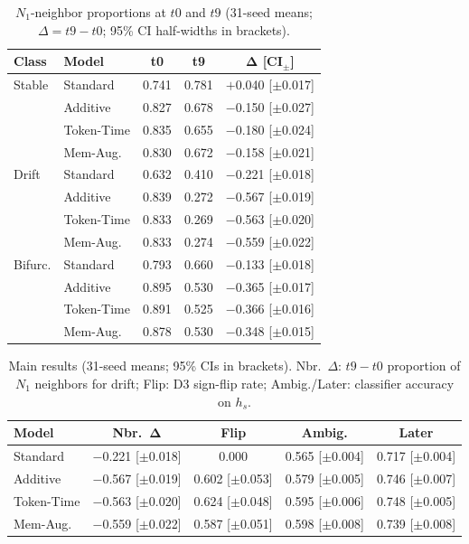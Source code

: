 \documentclass[runningheads]{llncs}
\begin{document}
\begin{table}[!t]
\caption{$N_1$-neighbor proportions at \(t0\) and \(t9\) (31-seed means;
\(\Delta=t9-t0\); 95\% CI half-widths in brackets).}
\label{tab:context-drift}
\centering
\scriptsize
\renewcommand{\arraystretch}{0.88}
\setlength{\tabcolsep}{4pt}
\begin{tabular}{llccc}
\toprule
\textbf{Class} & \textbf{Model} & \textbf{t0} & \textbf{t9} & \(\boldsymbol{\Delta}\) [CI\(_{\pm}\)] \\
\midrule
Stable & Standard & 0.741 & 0.781 & $+$0.040 [$\pm$0.017] \\
       & Additive & 0.827 & 0.678 & $-$0.150 [$\pm$0.027] \\
       & Token-Time    & 0.835 & 0.655 & $-$0.180 [$\pm$0.024] \\
       & Mem-Aug. & 0.830 & 0.672 & $-$0.158 [$\pm$0.021] \\
\midrule
Drift  & Standard & 0.632 & 0.410 & $-$0.221 [$\pm$0.018] \\
       & Additive & 0.839 & 0.272 & $-$0.567 [$\pm$0.019] \\
       & Token-Time    & 0.833 & 0.269 & $-$0.563 [$\pm$0.020] \\
       & Mem-Aug. & 0.833 & 0.274 & $-$0.559 [$\pm$0.022] \\
\midrule
Bifurc. & Standard & 0.793 & 0.660 & $-$0.133 [$\pm$0.018] \\
        & Additive & 0.895 & 0.530 & $-$0.365 [$\pm$0.017] \\
        & Token-Time    & 0.891 & 0.525 & $-$0.366 [$\pm$0.016] \\
        & Mem-Aug. & 0.878 & 0.530 & $-$0.348 [$\pm$0.015] \\
\bottomrule
\end{tabular}
\end{table}

\begin{table}[t]
\caption{Main results (31-seed means; 95\% CIs in brackets). Nbr.\ \(\Delta\):
\(t9-t0\) proportion of $N_1$ neighbors for drift; Flip: D3 sign-flip rate;
Ambig./Later: classifier accuracy on \(h_s\).}
\label{tab:main-results}
\centering
\scriptsize
\renewcommand{\arraystretch}{0.88}
\setlength{\tabcolsep}{4pt}
\begin{tabular}{lcccc}
\toprule
\textbf{Model} & \textbf{Nbr.\ \(\boldsymbol{\Delta}\)} & \textbf{Flip} & \textbf{Ambig.} & \textbf{Later} \\
\midrule
Standard & $-$0.221 [$\pm$0.018] & 0.000 & 0.565 [$\pm$0.004] & 0.717 [$\pm$0.004] \\
Additive & $-$0.567 [$\pm$0.019] & 0.602 [$\pm$0.053] & 0.579 [$\pm$0.005] & 0.746 [$\pm$0.007] \\
Token-Time    & $-$0.563 [$\pm$0.020] & 0.624 [$\pm$0.048] & 0.595 [$\pm$0.006] & 0.748 [$\pm$0.005] \\
Mem-Aug. & $-$0.559 [$\pm$0.022] & 0.587 [$\pm$0.051] & 0.598 [$\pm$0.008] & 0.739 [$\pm$0.008] \\
\bottomrule
\end{tabular}
\end{table}
\end{document}
